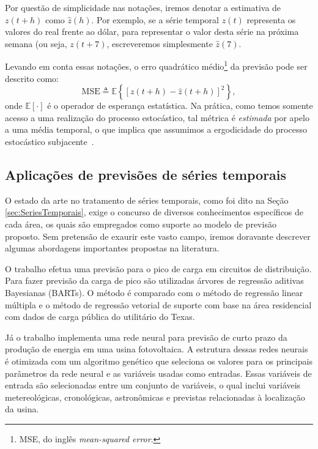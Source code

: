 Por questão de simplicidade nas notações, iremos denotar a estimativa de $z(t+h)$ como $\hat{z}(h)$. Por exemplo, se a série temporal $z(t)$ representa os valores do real frente ao dólar, para representar o valor desta série na próxima semana (ou seja, $z(t + 7)$, escreveremos simplesmente $\hat{z}(7)$. 

Levando em conta essas notações, o erro quadrático médio\footnote{MSE, do inglês \emph{mean-squared error}.} da previsão pode ser descrito como:
\begin{equation}
\text{MSE} \triangleq \mathbb{E}\left\{\left[z(t + h) - \hat{z}(t+h)\right]^2\right\},
\end{equation}
onde $\mathbb{E}[\cdot]$ é o operador de esperança estatística. Na prática, como temos somente acesso a uma realização do processo estocástico, tal métrica é \emph{estimada} por apelo a uma média temporal, o que implica que assumimos a ergodicidade do processo estocástico subjacente~\cite{LonnieRandomProcesses2003}.

\subsection{Aplicações de previsões de séries temporais}
O estado da arte no tratamento de séries temporais, como foi dito na Seção \ref{sec:SeriesTemporais}, exige o concurso de diversos conhecimentos específicos de cada área, os quais são empregados como suporte ao modelo de previsão proposto. Sem pretensão de exaurir este vasto campo, iremos doravante descrever algumas abordagens importantes propostas na literatura.

O trabalho \cite{8412670} efetua uma previsão para o pico de carga em circuitos de distribuição. Para fazer previsão da carga de pico são utilizadas árvores de regressão aditivas Bayesianas (BARTs). O método é comparado com o método de regressão linear múltipla e o método de regressão vetorial de suporte com base na área residencial com dados de carga pública do utilitário do Texas.

Já o trabalho \cite{8412036} implementa uma rede neural para previsão de curto prazo da produção de energia em uma usina fotovoltaica. A estrutura dessas redes neurais é otimizada com um algoritmo genético que seleciona os valores para os principais parâmetros da rede neural e as variáveis usadas como entradas. Essas variáveis de entrada são selecionadas entre um conjunto de variáveis, o qual inclui variáveis metereológicas, cronológicas, astronômicas e previstas relacionadas à localização da usina.

